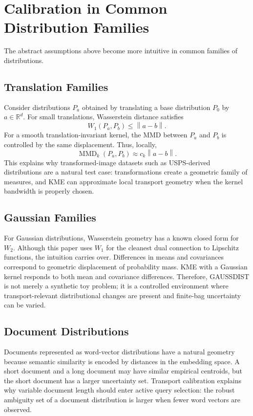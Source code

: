 \documentclass[10pt,journal]{IEEEtran}
\DeclareMathOperator{\MMD}{MMD}
\newcommand{\R}{\mathbb{R}}
\newcommand{\norm}[1]{\left\lVert #1 \right\rVert}
\begin{document}
\section{Calibration in Common Distribution Families}
\label{sec:families}

The abstract assumptions above become more intuitive in common families of distributions.

\subsection{Translation Families}

Consider distributions $P_a$ obtained by translating a base distribution $P_0$ by $a\in\R^d$. For small translations, Wasserstein distance satisfies
\begin{equation}
    W_1(P_a,P_b)\le \norm{a-b}.
\end{equation}
For a smooth translation-invariant kernel, the MMD between $P_a$ and $P_b$ is controlled by the same displacement. Thus, locally,
\begin{equation}
    \MMD_k(P_a,P_b)\approx c_k\norm{a-b}.
\end{equation}
This explains why transformed-image datasets such as USPS-derived distributions are a natural test case: transformations create a geometric family of measures, and KME can approximate local transport geometry when the kernel bandwidth is properly chosen.

\subsection{Gaussian Families}

For Gaussian distributions, Wasserstein geometry has a known closed form for $W_2$. Although this paper uses $W_1$ for the cleanest dual connection to Lipschitz functions, the intuition carries over. Differences in means and covariances correspond to geometric displacement of probability mass. KME with a Gaussian kernel responds to both mean and covariance differences. Therefore, GAUSSDIST is not merely a synthetic toy problem; it is a controlled environment where transport-relevant distributional changes are present and finite-bag uncertainty can be varied.

\subsection{Document Distributions}

Documents represented as word-vector distributions have a natural geometry because semantic similarity is encoded by distances in the embedding space. A short document and a long document may have similar empirical centroids, but the short document has a larger uncertainty set. Transport calibration explains why variable document length should enter active query selection: the robust ambiguity set of a document distribution is larger when fewer word vectors are observed.
\end{document}
